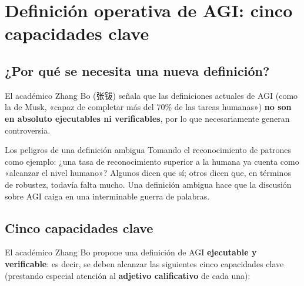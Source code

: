 \section{Definición operativa de AGI: cinco capacidades clave}

\subsection{¿Por qué se necesita una nueva definición?}

El académico Zhang Bo (张钹) señala que las definiciones actuales de AGI (como la de Musk, «capaz de completar más del 70\% de las tareas humanas») \textbf{no son en absoluto ejecutables ni verificables}, por lo que necesariamente generan controversia.

\begin{warningbox}{Los peligros de una definición ambigua}
Tomando el reconocimiento de patrones como ejemplo: ¿una tasa de reconocimiento superior a la humana ya cuenta como «alcanzar el nivel humano»? Algunos dicen que sí; otros dicen que, en términos de robustez, todavía falta mucho. Una definición ambigua hace que la discusión sobre AGI caiga en una interminable guerra de palabras.
\end{warningbox}

\subsection{Cinco capacidades clave}

El académico Zhang Bo propone una definición de AGI \textbf{ejecutable y verificable}: es decir, se deben alcanzar las siguientes cinco capacidades clave (prestando especial atención al \textbf{adjetivo calificativo} de cada una):

